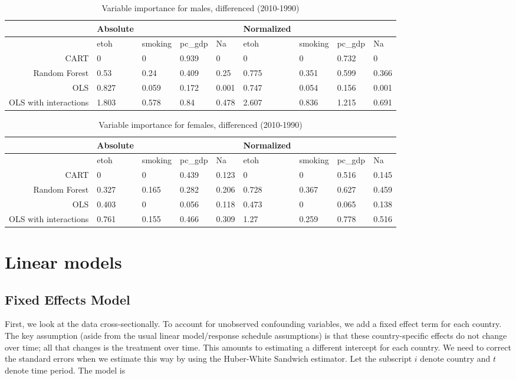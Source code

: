 \documentclass[11pt]{article}\usepackage[]{graphicx}\usepackage[]{color}
\begin{document}
 
\begin{table}[ht]
\centering
\begin{tabular}{r|llll|llll}
   \hline
 & Absolute &  &  &  & Normalized &  &  &  \\ 
   \hline
   & etoh & smoking & pc\_gdp & Na & etoh & smoking & pc\_gdp & Na \\ 
   \hline
CART & 0 & 0 & 0.939 & 0 & 0 & 0 & 0.732 & 0 \\ 
  Random Forest & 0.53 & 0.24 & 0.409 & 0.25 & 0.775 & 0.351 & 0.599 & 0.366 \\ 
  OLS & 0.827 & 0.059 & 0.172 & 0.001 & 0.747 & 0.054 & 0.156 & 0.001 \\ 
  OLS with interactions & 1.803 & 0.578 & 0.84 & 0.478 & 2.607 & 0.836 & 1.215 & 0.691 \\ 
   \hline
\end{tabular}
\caption{Variable importance for males, differenced (2010-1990)} 
\end{table}
\begin{table}[ht]
\centering
\begin{tabular}{r|llll|llll}
   \hline
 & Absolute &  &  &  & Normalized &  &  &  \\ 
   \hline
   & etoh & smoking & pc\_gdp & Na & etoh & smoking & pc\_gdp & Na \\ 
   \hline
CART & 0 & 0 & 0.439 & 0.123 & 0 & 0 & 0.516 & 0.145 \\ 
  Random Forest & 0.327 & 0.165 & 0.282 & 0.206 & 0.728 & 0.367 & 0.627 & 0.459 \\ 
  OLS & 0.403 & 0 & 0.056 & 0.118 & 0.473 & 0 & 0.065 & 0.138 \\ 
  OLS with interactions & 0.761 & 0.155 & 0.466 & 0.309 & 1.27 & 0.259 & 0.778 & 0.516 \\ 
   \hline
\end{tabular}
\caption{Variable importance for females, differenced (2010-1990)} 
\end{table}


\newpage

\section{Linear models}


\subsection{Fixed Effects Model}
First, we look at the data cross-sectionally.
To account for unobserved confounding variables, we add a fixed effect term for each country.
The key assumption (aside from the usual linear model/response schedule assumptions) is that these country-specific effects do not change over time; all that changes is the treatment over time.
This amounts to estimating a different intercept for each country.
We need to correct the standard errors when we estimate this way by using the Huber-White Sandwich estimator.
Let the subscript $i$ denote country and $t$ denote time period.
The model is
\end{document}
